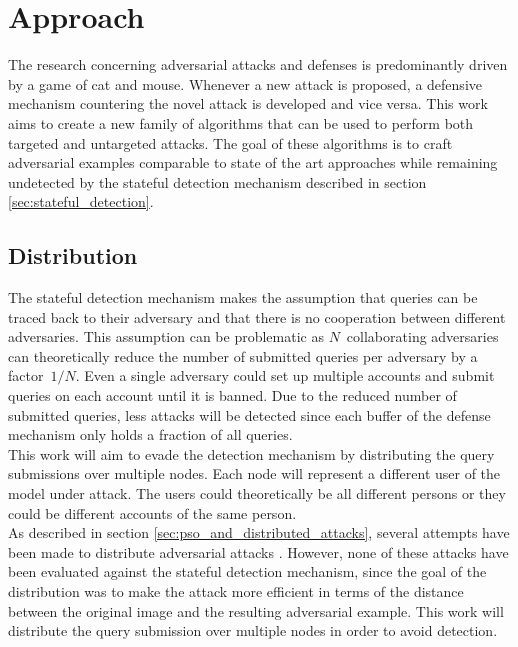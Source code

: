 \chapter{Approach}\label{chap:approach}
The research concerning adversarial attacks and defenses is predominantly driven by a game of cat and mouse. Whenever a new attack is proposed, a defensive mechanism countering the novel attack is developed and vice versa. This work aims to create a new family of algorithms that can be used to perform both targeted and untargeted attacks. The goal of these algorithms is to craft adversarial examples comparable to state of the art approaches while remaining undetected by the stateful detection mechanism \cite{chen_stateful_2019} described in section \ref{sec:stateful_detection}.

\section{Distribution}
The stateful detection mechanism \cite{chen_stateful_2019} makes the assumption that queries can be traced back to their adversary and that there is no cooperation between different adversaries. This assumption can be problematic as $N$~collaborating adversaries can theoretically reduce the number of submitted queries per adversary by a factor~$1/N$. Even a single adversary could set up multiple accounts and submit queries on each account until it is banned. Due to the reduced number of submitted queries, less attacks will be detected since each buffer of the defense mechanism only holds a fraction of all queries.\\

This work will aim to evade the detection mechanism by distributing the query submissions over multiple nodes. Each node will represent a different user of the model under attack. The users could theoretically be all different persons or they could be different accounts of the same person.\\

As described in section \ref{sec:pso_and_distributed_attacks}, several attempts have been made to distribute adversarial attacks \cite{distributed_pso_attack, suryanto2020}. However, none of these attacks have been evaluated against the stateful detection mechanism, since the goal of the distribution was to make the attack more efficient in terms of the distance between the original image and the resulting adversarial example. This work will distribute the query submission over multiple nodes in order to avoid detection.\\


